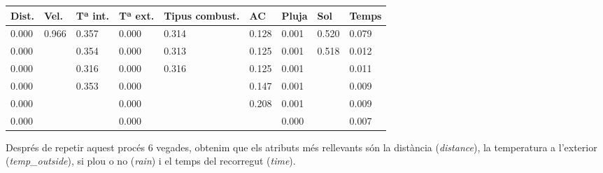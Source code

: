 \documentclass[a4paper, 11pt]{article}
\begin{document}
    \begin{table}[H]
        \centering
        \begin{tabular}{|l|l|l|l|l|l|l|l|l|}
            \hline
            \textbf{Dist.} & \textbf{Vel.}            & \textbf{Tª int.} & \textbf{Tª ext.} & \textbf{Tipus combust.}  & \textbf{AC} & \textbf{Pluja} & \textbf{Sol}                        & \textbf{Temps} \\ \hline
            0.000              & 0.966                    & 0.357                               & 0.000                              & 0.314                    & 0.128                         & 0.001          & 0.520                    & 0.079          \\ \hline
            0.000              & \cellcolor[HTML]{C0C0C0} & 0.354                               & 0.000                              & 0.313                    & 0.125                         & 0.001          & 0.518                    & 0.012          \\ \hline
            0.000              & \cellcolor[HTML]{C0C0C0} & 0.316                               & 0.000                              & 0.316                    & 0.125                         & 0.001          & \cellcolor[HTML]{C0C0C0} & 0.011          \\ \hline
            0.000              & \cellcolor[HTML]{C0C0C0} & 0.353                               & 0.000                              & \cellcolor[HTML]{C0C0C0} & 0.147                         & 0.001          & \cellcolor[HTML]{C0C0C0} & 0.009          \\ \hline
            0.000              & \cellcolor[HTML]{C0C0C0} & \cellcolor[HTML]{C0C0C0}            & 0.000                              & \cellcolor[HTML]{C0C0C0} & 0.208                         & 0.001          & \cellcolor[HTML]{C0C0C0} & 0.009          \\ \hline
            0.000              & \cellcolor[HTML]{C0C0C0} & \cellcolor[HTML]{C0C0C0}            & 0.000                              & \cellcolor[HTML]{C0C0C0} & \cellcolor[HTML]{C0C0C0}      & 0.000          & \cellcolor[HTML]{C0C0C0} & 0.007          \\ \hline
        \end{tabular}
    \end{table}

    Després de repetir aquest procés 6 vegades, obtenim que els atributs més rellevants són la
    distància (\textit{distance}), la temperatura a l'exterior (\textit{temp\_outside}), si
    plou o no (\textit{rain}) i el temps del recorregut (\textit{time}).\\
\end{document}
